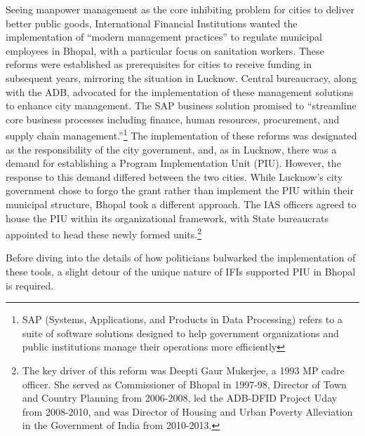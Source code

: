 Seeing manpower management as the core inhibiting problem for cities to deliver better public goods, International Financial Institutions wanted the implementation of ``modern management practices'' to regulate municipal employees in Bhopal, with a particular focus on sanitation workers. These reforms were established as prerequisites for cities to receive funding in subsequent years, mirroring the situation in Lucknow. Central bureaucracy, along with the ADB, advocated for the implementation of these management solutions to enhance city management. The SAP business solution promised to ``streamline core business processes including finance, human resources, procurement, and supply chain management.''\footnote{SAP (Systems, Applications, and Products in Data Processing) refers to a suite of software solutions designed to help government organizations and public institutions manage their operations more efficiently} The implementation of these reforms was designated as the responsibility of the city government, and, as in Lucknow, there was a demand for establishing a Program Implementation Unit (PIU). However, the response to this demand differed between the two cities. While Lucknow's city government chose to forgo the grant rather than implement the PIU within their municipal structure, Bhopal took a different approach. The IAS officers agreed to house the PIU within its organizational framework, with State bureaucrats appointed to head these newly formed units.\footnote{The key driver of this reform was Deepti Gaur Mukerjee, a 1993 MP cadre officer. She served as Commissioner of Bhopal in 1997-98, Director of Town and Country Planning from 2006-2008, led the ADB-DFID Project Uday from 2008-2010, and was Director of Housing and Urban Poverty Alleviation in the Government of India from 2010-2013.}

Before diving into the details of how politicians bulwarked the implementation of these tools, a slight detour of the unique nature of IFIs supported PIU in Bhopal is required.

